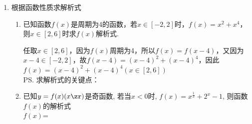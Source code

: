 \begin{enumerate}
\begin{enumerate}
\begin{jieda}
            由奇函数和周期性可知$f(1.5) = f(-1,5) = 0$，进一步可知$f(4.5) = 0$ \\
            \ps 对于周期为$T$的奇函数，必有$f(\frac{T}{2}) = f(-\frac{T}{2}) = 0$
        \end{jieda}
        \item 已知$f(x)$是定义域为$(-\infty, +\infty)$的奇函数，满足$f(1-x) = f(1+x)$。若$f(1) = 2$，则$f(1)+f(2)+f(3)+...+f(50) = $\dotfill()
        {0}
        {2}
        {50}
        \begin{jieda}
            因为$f(x)$为奇函数，且$f(1-x) = f(1+x)$，故$f(x)$具有周期性，最小正周期为4，即$f(x) = f(x+4)$. 由题意可知$f(0) = 0, f(1) = 2$, 可以推出$f(2) = 0, f(3) = f(-1) = -2$，由此可知$f(4k)+f(4k+1)+f(4k+2)+f(4k+3)=0, k \in \mathbf{Z}$。故原式$= f(1) + f(2) = 2$ \\
            \ps 具有周期性的求和问题，先求一个周期内的和.
        \end{jieda}
    \end{enumerate}
    \item 根据函数性质求解析式
    \begin{enumerate}
        \item 已知函数$f(x)$是周期为$4$的函数，若$x \in [-2, 2]$时，$f(x) = x^2 + x^4$，则$x \in [2, 6]$时求$f(x)$解析式.
        \begin{jieda}
            任取$x \in [2, 6]$，因为$f(x)$周期为4，所以$f(x) = f(x - 4)$，又因为$x - 4 \in [-2, 2]$，故$f(x-4) = (x-4)^2 + (x-4)^4$，因此$f(x) = (x-4)^2 + (x-4)^4 (x \in [2, 6])$ \\
            \ps 求解析式的关键点：
        \end{jieda}
        \item 已知$y=f(x)(x\zr)$是奇函数, 若当$x<0$时, $f(x)=x^{\frac{1}{3}}+2^x-1$, 则函数$f(x)$的解析式\\
        $f(x)$=
\end{enumerate}
\end{enumerate}
